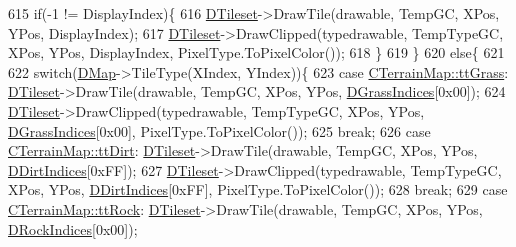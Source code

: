 \begin{DoxyCode}
{{{{{{{{615                     \textcolor{keywordflow}{if}(-1 != DisplayIndex)\{
616                         \hyperlink{classCMapRenderer_ace0648cba050b5e02431096edd15b836}{DTileset}->DrawTile(drawable, TempGC, XPos, YPos, DisplayIndex);
617                         \hyperlink{classCMapRenderer_ace0648cba050b5e02431096edd15b836}{DTileset}->DrawClipped(typedrawable, TempTypeGC, XPos, YPos, DisplayIndex, 
      PixelType.ToPixelColor());
618                     \}
619                 \}
620                 \textcolor{keywordflow}{else}\{
621                     
622                     \textcolor{keywordflow}{switch}(\hyperlink{classCMapRenderer_ab9a199c61aa1c87a3248af3085d8ba52}{DMap}->TileType(XIndex, YIndex))\{
623                         \textcolor{keywordflow}{case} \hyperlink{classCTerrainMap_aff2ab991e237269941416dd79d8871d4ae587716ed26a437b6ea33f0ac823d47a}{CTerrainMap::ttGrass}:          
      \hyperlink{classCMapRenderer_ace0648cba050b5e02431096edd15b836}{DTileset}->DrawTile(drawable, TempGC, XPos, YPos, \hyperlink{classCMapRenderer_abea42ed77fce8a53ef0cfd6c82a5d676}{DGrassIndices}[0x00]);
624                                                             \hyperlink{classCMapRenderer_ace0648cba050b5e02431096edd15b836}{DTileset}->DrawClipped(typedrawable, 
      TempTypeGC, XPos, YPos, \hyperlink{classCMapRenderer_abea42ed77fce8a53ef0cfd6c82a5d676}{DGrassIndices}[0x00], PixelType.ToPixelColor());
625                                                             \textcolor{keywordflow}{break};
626                         \textcolor{keywordflow}{case} \hyperlink{classCTerrainMap_aff2ab991e237269941416dd79d8871d4a49fb754039632e7127fca005dd95bab8}{CTerrainMap::ttDirt}:           
      \hyperlink{classCMapRenderer_ace0648cba050b5e02431096edd15b836}{DTileset}->DrawTile(drawable, TempGC, XPos, YPos, \hyperlink{classCMapRenderer_a5916c26aa5bedf8367a8f3f7efb457bf}{DDirtIndices}[0xFF]);
627                                                             \hyperlink{classCMapRenderer_ace0648cba050b5e02431096edd15b836}{DTileset}->DrawClipped(typedrawable, 
      TempTypeGC, XPos, YPos, \hyperlink{classCMapRenderer_a5916c26aa5bedf8367a8f3f7efb457bf}{DDirtIndices}[0xFF], PixelType.ToPixelColor());
628                                                             \textcolor{keywordflow}{break};
629                         \textcolor{keywordflow}{case} \hyperlink{classCTerrainMap_aff2ab991e237269941416dd79d8871d4a215740f194a2d72a21d47c848fbfecad}{CTerrainMap::ttRock}:           
      \hyperlink{classCMapRenderer_ace0648cba050b5e02431096edd15b836}{DTileset}->DrawTile(drawable, TempGC, XPos, YPos, \hyperlink{classCMapRenderer_ac9178a9c9d30ac44aed7d324c51164a4}{DRockIndices}[0x00]);
}}}}}}}}
\end{DoxyCode}
